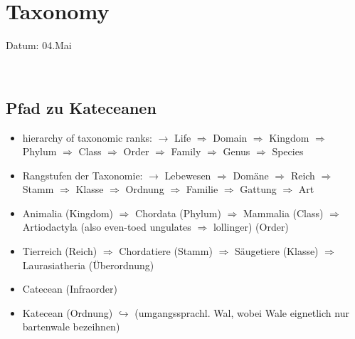 \documentclass[12pt,a4paper]{article}
\begin{document}









\newpage
\section{Taxonomy}
\addtocounter{section}{1}
Datum: 04.Mai \ 

\noindent\hrulefill  \


\subsection{Pfad zu Kateceanen} %
\label{sub:Pfad zu Kateceanen}

\begin{itemize}
  \item hierarchy of taxonomic ranks: 
  \newline \indent $\longrightarrow$ Life $\Longrightarrow$ Domain $\Longrightarrow$ Kingdom $\Longrightarrow$ Phylum $\Longrightarrow$ Class $\Longrightarrow$ Order $\Longrightarrow$ Family $\Longrightarrow$ Genus $\Longrightarrow$ Species
  \item Rangstufen der Taxonomie: 
  \newline \indent $\longrightarrow$ Lebewesen $\Longrightarrow$ Domäne $\Longrightarrow$ Reich $\Longrightarrow$ Stamm $\Longrightarrow$ Klasse $\Longrightarrow$ Ordnung $\Longrightarrow$ Familie $\Longrightarrow$ Gattung $\Longrightarrow$ Art
 \item Animalia (Kingdom) $\Longrightarrow$ Chordata (Phylum) $\Longrightarrow$ Mammalia (Class) $\Longrightarrow$ Artiodactyla (also even-toed ungulates $\Longrightarrow$ lollinger) (Order)
 \item Tierreich (Reich) $\Longrightarrow$ Chordatiere (Stamm) $\Longrightarrow$ Säugetiere (Klasse) $\Longrightarrow$ Laurasiatheria (Überordnung)
   \item Catecean (Infraorder)
   \item Katecean (Ordnung) 
   \newline \indent $\hookrightarrow$ (umgangssprachl. Wal, wobei Wale eignetlich nur bartenwale bezeihnen)
\end{itemize}
\end{document}

